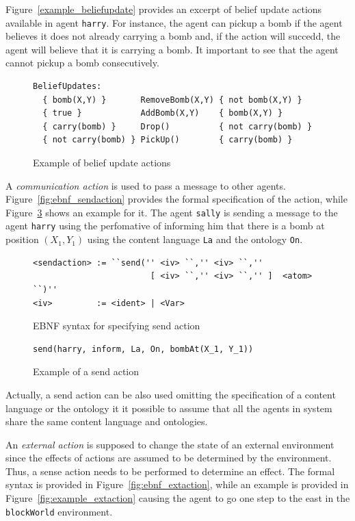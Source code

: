 \documentclass[a4paper]{article}
\begin{document}
Figure~\ref{example_beliefupdate} provides an excerpt of belief update actions available in agent \texttt{harry}. For instance, the agent can pickup a bomb if the agent believes it does not already carrying a bomb and, if the action will succedd, the agent will believe that it is carrying a bomb. It important to see that the agent cannot pickup a bomb consecutively.

\begin{figure}[htp]
\begin{verbatim}
BeliefUpdates:
  { bomb(X,Y) }       RemoveBomb(X,Y) { not bomb(X,Y) }
  { true }            AddBomb(X,Y)    { bomb(X,Y) }
  { carry(bomb) }     Drop()          { not carry(bomb) }
  { not carry(bomb) } PickUp()        { carry(bomb) }
\end{verbatim}
\caption{Example of belief update actions}
\label{fig:ebnf_beliefupdate}
\end{figure}

A \emph{communication action} is used to pass a message to other agents. Figure~\ref{fig:ebnf_sendaction} provides the formal specification of the action, while Figure~\ref{fig:example_sendaction} shows an example for it. The agent \texttt{sally} is sending a message to the agent \texttt{harry} using the perfomative of informing him that there is a bomb at position $(X_1, Y_1)$ using the content language \texttt{La} and the ontology \texttt{On}.

\begin{figure}[htp]
\begin{verbatim}
<sendaction> := ``send('' <iv> ``,'' <iv> ``,''
                        [ <iv> ``,'' <iv> ``,'' ]  <atom> ``)''  
<iv>         := <ident> | <Var>
\end{verbatim}
\caption{EBNF syntax for specifying send action}
\label{fig:ebnf_beliefupdate}
\end{figure}

\begin{figure}[htp]
\begin{verbatim}
send(harry, inform, La, On, bombAt(X_1, Y_1))
\end{verbatim}
\caption{Example of a send action}
\label{fig:example_sendaction}
\end{figure}

Actually, a send action can be also used omitting the specification of a content language or the ontology it it possible to assume that all the agents in system share the same content language and ontologies.

An \emph{external action} is supposed to change the state of an external environment since the effects of actions are assumed to be determined by the environment. Thus, a sense action needs to be performed to determine an effect. The formal syntax is provided in Figure~\ref{fig:ebnf_extaction}, while an example is provided in Figure~\ref{fig:example_extaction} causing the agent to go one step to the east in the \texttt{blockWorld} environment.
\end{document}
